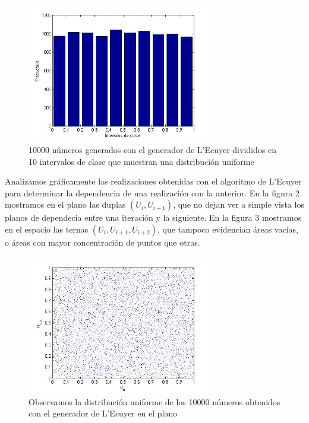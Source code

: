 \documentclass[10pt,journal,compsoc]{IEEEtran}
\begin{document}
\begin{figure}[t]
\label{fig:histogramalecuyer}
\begin{center}
\centering
\includegraphics[width=3.2in]{clases.jpg}
\caption{10000 n\'umeros generados con el generador de L'Ecuyer divididos en 10 intervalos de clase que muestran una distribuci\'on uniforme}
\end{center}
\end{figure}


Analizamos gr\'aficamente las realizaciones obtenidas con el algoritmo de L'Ecuyer para determinar la dependencia de una realizaci\'on 
con la anterior.  En la figura 2 mostramos en el plano las duplas $(U_i, U_{i+1})$, que no dejan ver a simple vista los planos de dependecia entre una
iteraci\'on y la siguiente.  En la figura 3 mostramos en el espacio las ternas $(U_i, U_{i+1}, U_{i+2})$, que tampoco evidencian \'areas vac\'ias, o \'areas con mayor concentraci\'on de puntos que otras.


\begin{figure}[t]
\label{fig:2d}
\begin{center}
\centering
\includegraphics[width=3.2in]{2d_groso.jpg}
\caption{Observamos la distribuci\'on uniforme de los 10000 n\'umeros obtenidos con el generador de L'Ecuyer en el plano}
\end{center}
\end{figure}
\end{document}
